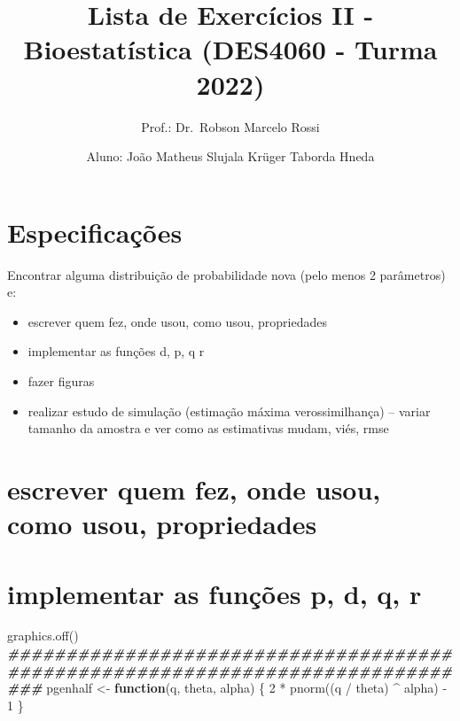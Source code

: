 \documentclass[
]{article}
\title{Lista de Exercícios II - Bioestatística (DES4060 - Turma 2022)}
\author{Prof.: Dr.~Robson Marcelo Rossi \and Aluno: João Matheus Slujala
Krüger Taborda Hneda}
\date{}
\newenvironment{Shaded}{\begin{snugshade}}{\end{snugshade}}
\newcommand{\ControlFlowTok}[1]{\textcolor[rgb]{0.13,0.29,0.53}{\textbf{#1}}}
\newcommand{\DecValTok}[1]{\textcolor[rgb]{0.00,0.00,0.81}{#1}}
\newcommand{\DocumentationTok}[1]{\textcolor[rgb]{0.56,0.35,0.01}{\textbf{\textit{#1}}}}
\newcommand{\FunctionTok}[1]{\textcolor[rgb]{0.00,0.00,0.00}{#1}}
\newcommand{\NormalTok}[1]{#1}
\newcommand{\OtherTok}[1]{\textcolor[rgb]{0.56,0.35,0.01}{#1}}
\newcommand{\SpecialCharTok}[1]{\textcolor[rgb]{0.00,0.00,0.00}{#1}}
\providecommand{\tightlist}{%
  \setlength{\itemsep}{0pt}\setlength{\parskip}{0pt}}
\begin{document}
\maketitle

\renewcommand*\contentsname{Sumário}
{
\setcounter{tocdepth}{5}
\tableofcontents
}
\newpage

\hypertarget{especificauxe7uxf5es}{%
\section{Especificações}\label{especificauxe7uxf5es}}

Encontrar alguma distribuição de probabilidade nova (pelo menos 2
parâmetros) e:

\begin{itemize}
\tightlist
\item
  escrever quem fez, onde usou, como usou, propriedades
\item
  implementar as funções d, p, q r
\item
  fazer figuras
\item
  realizar estudo de simulação (estimação máxima verossimilhança) --
  variar tamanho da amostra e ver como as estimativas mudam, viés, rmse
\end{itemize}

\hypertarget{escrever-quem-fez-onde-usou-como-usou-propriedades}{%
\section{escrever quem fez, onde usou, como usou,
propriedades}\label{escrever-quem-fez-onde-usou-como-usou-propriedades}}

\hypertarget{implementar-as-funuxe7uxf5es-p-d-q-r}{%
\section{implementar as funções p, d, q,
r}\label{implementar-as-funuxe7uxf5es-p-d-q-r}}

\begin{Shaded}
\begin{Highlighting}[]
\FunctionTok{graphics.off}\NormalTok{()}
\DocumentationTok{\#\#\#\#\#\#\#\#\#\#\#\#\#\#\#\#\#\#\#\#\#\#\#\#\#\#\#\#\#\#\#\#\#\#\#\#\#\#\#\#\#\#\#\#\#\#\#\#\#\#\#\#\#\#\#\#\#\#\#\#\#\#\#\#\#\#\#\#\#\#\#\#\#\#\#\#\#\#\#}
\NormalTok{pgenhalf }\OtherTok{\textless{}{-}} \ControlFlowTok{function}\NormalTok{(q, theta, alpha)}
\NormalTok{\{}
  \DecValTok{2} \SpecialCharTok{*} \FunctionTok{pnorm}\NormalTok{((q }\SpecialCharTok{/}\NormalTok{ theta) }\SpecialCharTok{\^{}}\NormalTok{ alpha) }\SpecialCharTok{{-}} \DecValTok{1}
\NormalTok{\}}
\end{Highlighting}
\end{Shaded}
\end{document}
